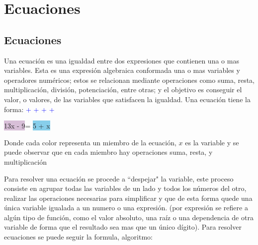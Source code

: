 \documentclass[12pt]{article}
\newcommand{\comillas}[1]{``#1"}
\newcommand{\p}{\textcolor{Blue}{+ + + +}}
\begin{document}
\section{Ecuaciones}
\subsection{Ecuaciones}\label{Ecuaciones}
Una ecuación es una igualdad entre dos expresiones que contienen una o mas
variables.  Esta es una expresión algebraica conformada una o mas variables y
operadores numéricos; estos se relacionan mediante operaciones como
suma, resta, multiplicación, división, potenciación, entre otras; y el objetivo
es conseguir el valor, o valores, de las variables que satisfacen la igualdad.
Una ecuación tiene la forma:
\p

 \colorbox{Thistle}{13x - 9}= \colorbox{SkyBlue}{5 + x}

Donde cada color representa un miembro de la ecuación, $x$ es la variable y se
puede observar que en cada miembro hay operaciones  suma, resta, y multiplicación


Para resolver una ecuación se procede a \comillas{despejar} la variable, este
proceso consiste
en agrupar todas las variables de un lado y todos los números del otro, realizar
las operaciones necesarias para simplificar y que de esta forma quede una única
variable igualada a un numero o una expresión. (por expresión se refiere a algún
tipo de función, como el valor absoluto, una raíz o una dependencia de otra variable
de forma que el resultado sea mas que un único dígito). Para resolver ecuaciones
se puede seguir la formula, algoritmo:
\end{document}
